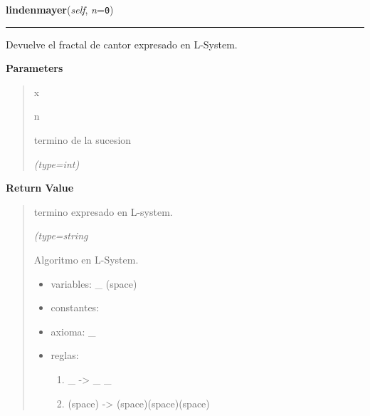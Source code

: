 \hspace{.8\funcindent}\begin{boxedminipage}{\funcwidth}

    \raggedright \textbf{lindenmayer}(\textit{self}, \textit{n}={\tt 0})

    \vspace{-1.5ex}

    \rule{\textwidth}{0.5\fboxrule}
\setlength{\parskip}{2ex}
    Devuelve el fractal de cantor expresado en L-System.

\setlength{\parskip}{1ex}
      \textbf{Parameters}
      \vspace{-1ex}

      \begin{quote}
        \begin{Ventry}{x}

          \item[n]

          termino de la sucesion

            {\it (type=int)}

        \end{Ventry}

      \end{quote}

      \textbf{Return Value}
    \vspace{-1ex}

      \begin{quote}
      termino expresado en L-system.

      {\it (type=string

      Algoritmo en L-System.

      \begin{itemize}
      \setlength{\parskip}{0.6ex}
        \item variables: \_ (space)

        \item constantes:

        \item axioma: \_

        \item reglas:

          \begin{enumerate}

          \setlength{\parskip}{0.5ex}
            \item \_ -{\textgreater} \_ \_

            \item (space) -{\textgreater} (space)(space)(space)


\end{enumerate}
\end{itemize}}
\end{quote}
\end{boxedminipage}
